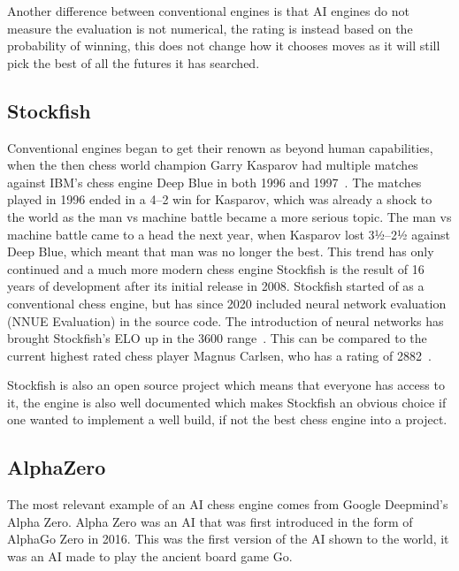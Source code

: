 Another difference between conventional engines is that AI engines do not measure the evaluation is not numerical, the
rating is instead based on the probability of winning, this does not change how it chooses moves as it will still pick
the best of all the futures it has searched.

\subsection{Stockfish}\label{subsec:stockfish}

Conventional engines began to get their renown as beyond human capabilities, when the then chess world champion
Garry Kasparov had multiple matches against IBM's chess engine Deep Blue in both 1996 and
1997~\cite{Garry-Kasparov-vs-Deep-Blue}.
The matches played in 1996 ended in a 4--2 win for Kasparov, which was already a shock to the world as the man vs
machine battle became a more serious topic.
The man vs machine battle came to a head the next year, when Kasparov lost 3½--2½ against Deep Blue, which meant that
man was no longer the best.
This trend has only continued and a much more modern chess engine Stockfish is the result of 16 years of development
after its initial release in 2008.
Stockfish started of as a conventional chess engine, but has since 2020 included neural network
evaluation (NNUE Evaluation) in the source code.
The introduction of neural networks has brought Stockfish's ELO up in the 3600 range~\cite{Stockfish}.
This can be compared to the current highest rated chess player Magnus Carlsen, who has a
rating of 2882~\cite{highest-ELO-chess-player}.

Stockfish is also an open source project which means that everyone has access to it, the engine is also well documented
which makes Stockfish an obvious choice if one wanted to implement a well build, if not the best chess engine into a
project.

\subsection{AlphaZero}\label{subsec:alphazero}

The most relevant example of an AI chess engine comes from Google Deepmind's Alpha Zero.
Alpha Zero was an AI that was first introduced in the form of AlphaGo Zero in 2016.
This was the first version of the AI shown to the world, it was an AI made to play the ancient board game Go.

